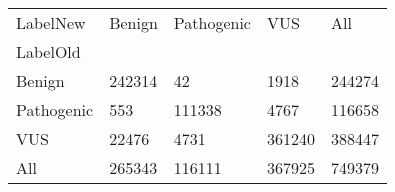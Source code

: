 \begin{tabular}{lllll}
\toprule
LabelNew &        Benign &    Pathogenic &           VUS &           All \\
LabelOld   &               &               &               &               \\
\midrule
Benign     &  \num{242314} &      \num{42} &    \num{1918} &  \num{244274} \\
Pathogenic &     \num{553} &  \num{111338} &    \num{4767} &  \num{116658} \\
VUS        &   \num{22476} &    \num{4731} &  \num{361240} &  \num{388447} \\
All        &  \num{265343} &  \num{116111} &  \num{367925} &  \num{749379} \\
\bottomrule
\end{tabular}
